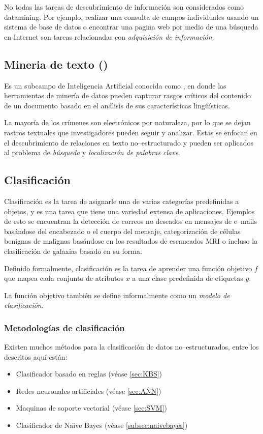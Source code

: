 No todas las tareas de descubrimiento de información son considerados como \gls{datamining}. Por ejemplo, realizar una consulta de campos individuales usando un sistema de base de datos o encontrar una pagina web por medio de una búsqueda en Internet son tareas relacionadas con \emph{adquisición de información}.

\subsection{Mineria de texto ()} \label{subsec:NLP}
Es un subcampo de Inteligencia Artificial conocida como , en donde las herramientas de minería de datos pueden capturar rasgos críticos del contenido de un documento basado en el análisis de sus características lingüísticas.

La mayoría de los crímenes son electrónicos por naturaleza, por lo que se dejan rastros textuales que investigadores pueden seguir y analizar. Estas se enfocan en el descubrimiento de relaciones en texto no--estructurado y pueden ser aplicados al problema de \emph{búsqueda} y \emph{localización de palabras clave}.

\subsection{Clasificación} \label{subsec:clasification}
Clasificación es la tarea de asignarle una de varias categorías predefinidas a objetos, y es una tarea que tiene una variedad extensa de aplicaciones. Ejemplos de esto se encuentran la detección de correos no deseados en mensajes de e--mails basándose del encabezado o el cuerpo del mensaje, categorización de células benignas de malignas basándose en los resultados de escaneados MRI o incluso la clasificación de galaxias basado en su forma.

Definido formalmente, clasificación es la tarea de aprender una función objetivo $f$ que mapea cada conjunto de atributos $x$ a una clase predefinida de etiquetas $y$.

La función objetivo también se define informalmente como un \emph{modelo de clasificación}.

\subsubsection{Metodologías de clasificación} \label{subsubsec:classmethods}
Existen muchos métodos para la clasificación de datos no--estructurados, entre los descritos aquí están:
\begin{itemize}
\item Clasificador basado en reglas (véase \ref{sec:KBS})
\item Redes neuronales artificiales (véase \ref{sec:ANN})
\item Maquinas de soporte vectorial (véase \ref{sec:SVM})
\item Clasificador de Na\"{\i}ve Bayes (véase \ref{subsec:naivebayes})
\end{itemize}

